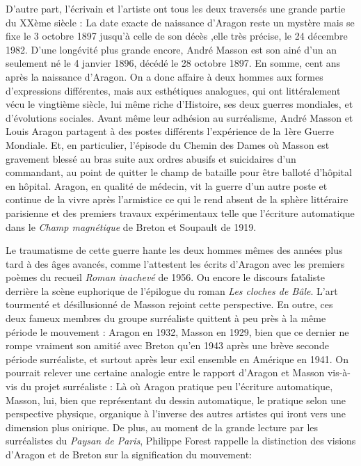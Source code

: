 D’autre part, l’écrivain et l’artiste ont tous les deux traversés une grande partie du XXème siècle : La date  exacte de naissance d’Aragon reste un mystère mais se fixe le 3 octobre 1897 jusqu’à celle de son décès ,elle très précise, le 24 décembre 1982. D’une longévité plus grande encore, André Masson est son ainé d’un an seulement né le 4 janvier 1896, décédé le 28 octobre 1897. En somme, cent ans après la naissance d’Aragon. On a donc affaire à deux hommes aux formes d’expressions différentes, mais aux esthétiques analogues, qui ont littéralement vécu le vingtième siècle, lui même riche d’Histoire, ses deux guerres mondiales, et d’évolutions sociales. Avant même leur adhésion au surréalisme, André Masson et Louis Aragon partagent à des postes différents l’expérience de la 1ère Guerre Mondiale. Et, en particulier, l’épisode du Chemin des Dames où Masson est gravement blessé au bras suite aux ordres abusifs et suicidaires d’un commandant, au point de quitter le champ de bataille pour être balloté d’hôpital en hôpital. Aragon, en qualité de médecin, vit la guerre d’un autre poste et continue de la vivre après l’armistice ce qui le rend absent de la sphère littéraire parisienne et des premiers travaux expérimentaux telle que l’écriture automatique dans le \emph{Champ magnétique} de Breton et Soupault de 1919.

Le traumatisme de cette guerre hante les deux hommes mêmes des années plus tard à des âges avancés, comme l’attestent les écrits d’Aragon avec les premiers poèmes du recueil \emph{Roman inachevé} de 1956. Ou encore  le discours fataliste derrière la scène euphorique de l’épilogue du roman \emph{Les cloches de Bâle}. L’art tourmenté et désillusionné de Masson rejoint cette perspective. En outre, ces deux fameux membres du groupe surréaliste quittent à peu près à la même période le mouvement : Aragon en 1932, Masson en 1929, bien que ce dernier ne rompe vraiment son amitié avec Breton qu’en 1943 après une brève seconde période surréaliste, et surtout après leur exil ensemble en Amérique en 1941. On pourrait relever une certaine analogie entre le rapport d’Aragon et Masson vis-à-vis du projet surréaliste : Là où Aragon pratique peu l’écriture automatique, Masson, lui, bien que représentant du dessin automatique, le pratique selon une perspective physique, organique à l’inverse des autres artistes qui iront vers une dimension plus onirique. De plus, au moment de la grande lecture par les surréalistes du \emph{Paysan de Paris}, Philippe Forest rappelle la distinction des visions d’Aragon et de Breton sur la signification du mouvement: 

